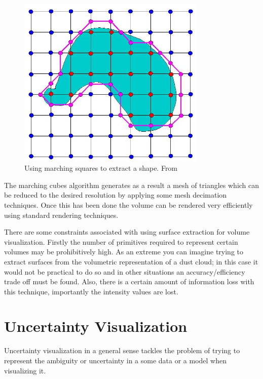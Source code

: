 \begin{figure}[h]
    \centering
	\includegraphics[width=0.8\textwidth]{images/background/marching_squares.jpg}
    \caption{Using marching squares to extract a shape. From \cite{marching_squares:image}}
    \label{fig:marching_squares}
\end{figure}

The marching cubes algorithm generates as a result a mesh of triangles which can be reduced to the desired resolution by applying some mesh decimation techniques. Once this has been done the volume can be rendered very efficiently using standard rendering techniques.

There are some constraints associated with using surface extraction for volume visualization. Firstly the number of primitives required to represent certain volumes may be prohibitively high. As an extreme you can imagine trying to extract surfaces from the volumetric representation of a dust cloud; in this case it would not be practical to do so and in other situations an accuracy/efficiency trade off must be found. Also, there is a certain amount of information loss with this technique, importantly the intensity values are lost.

\newpage
\section{Uncertainty Visualization}\label{background:uncertaintyvisualization}
\cite{uncertaintyoverview}
Uncertainty visualization in a general sense tackles the problem of trying to represent the ambiguity or uncertainty in a some data or a model when visualizing it.

